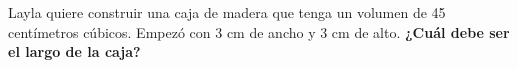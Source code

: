Layla quiere construir una caja de madera que tenga un volumen de 45 centímetros cúbicos.
Empezó con 3 cm de ancho y 3 cm de alto.
\textbf{¿Cuál debe ser el largo de la caja?}
\fillin[5][1cm]